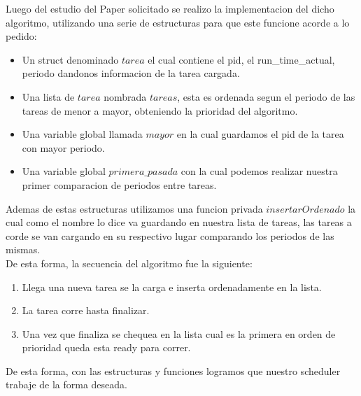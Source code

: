 Luego del estudio del Paper solicitado se realizo la implementacion del dicho algoritmo,
utilizando una serie de estructuras para que este funcione acorde a lo pedido:

\begin{itemize}
 \item Un struct denominado $tarea$ el cual contiene el pid, el run\_time\_actual, periodo dandonos
 informacion de la tarea cargada.
 \item Una lista de $tarea$ nombrada $tareas$, esta es ordenada segun el periodo de las tareas
 de menor a mayor, obteniendo la prioridad del algoritmo.
 \item Una variable global llamada $mayor$ en la cual guardamos el pid de la tarea con mayor
 periodo.
 \item Una variable global $primera\_pasada$ con la cual podemos realizar nuestra primer 
 comparacion de periodos entre tareas.
\end{itemize}

Ademas de estas estructuras utilizamos una funcion privada $insertarOrdenado$ la cual como el
nombre lo dice va guardando en nuestra lista de tareas, las tareas a corde se van cargando en su
respectivo lugar comparando los periodos de las mismas.\\
De esta forma, la secuencia del algoritmo fue la siguiente:

\begin{enumerate}
 \item Llega una nueva tarea se la carga e inserta ordenadamente en la lista.
 \item La tarea corre hasta finalizar.
 \item Una vez que finaliza se chequea en la lista cual es la primera en orden de prioridad queda
 esta ready para correr.
 \end{enumerate}

De esta forma, con las estructuras y funciones logramos que nuestro scheduler trabaje de la forma
deseada.
